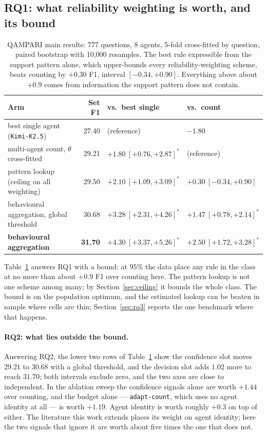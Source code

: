 \documentclass{article}
\begin{document}
\subsection{RQ1: what reliability weighting is worth, and its bound}
\label{sec:rq1}

\begin{table}
  \caption{QAMPARI main results: 777 questions, 8 agents, 5-fold cross-fitted by question, paired bootstrap with 10,000 resamples. The best rule expressible from the support pattern alone, which upper-bounds every reliability-weighting scheme, beats counting by $+0.30$ F1, interval $[-0.34, +0.90]$. Everything above about $+0.9$ comes from information the support pattern does not contain.}
  \label{tab:main}
  \centering
  \begin{tabular}{lrll}
    \toprule
    Arm & Set F1 & vs.\ best single & vs.\ count \\
    \midrule
    best single agent (\texttt{Kimi-K2.5})  & 27.40 & (reference)              & $-1.80$ \\
    multi-agent count, $\theta$ cross-fitted & 29.21 & $+1.80\ [+0.76,+2.87]^*$ & (reference) \\
    pattern lookup (ceiling on all weighting) & 29.50 & $+2.10\ [+1.09,+3.09]^*$ & $+0.30\ [-0.34,+0.90]$ \\
    behavioural aggregation, global threshold & 30.68 & $+3.28\ [+2.31,+4.26]^*$ & $+1.47\ [+0.78,+2.14]^*$ \\
    \textbf{behavioural aggregation}         & \textbf{31.70} & $\mathbf{+4.30\ [+3.37,+5.26]^*}$ & $\mathbf{+2.50\ [+1.72,+3.28]^*}$ \\
    \bottomrule
  \end{tabular}
\end{table}


Table~\ref{tab:main} answers RQ1 with a bound: at $95\%$ the data place any rule in the class at no more than about $+0.9$ F1 over counting here. The pattern lookup is not one scheme among many; by Section~\ref{sec:ceiling} it bounds the whole class. The bound is on the population optimum, and the estimated lookup can be beaten in sample where cells are thin; Section~\ref{sec:rq3} reports the one benchmark where that happens.

\paragraph{RQ2: what lies outside the bound.}
Answering RQ2, the lower two rows of Table~\ref{tab:main} show the confidence slot moves $29.21$ to $30.68$ with a global threshold, and the decision slot adds $1.02$ more to reach $31.70$; both intervals exclude zero, and the two axes are close to independent. In the ablation sweep the confidence signals alone are worth $+1.44$ over counting, and the budget alone --- \texttt{adapt-count}, which uses no agent identity at all --- is worth $+1.19$. %
Agent identity is worth roughly $+0.3$ on top of either. The literature this work extends places its weight on agent identity; here the two signals that ignore it are worth about five times the one that does not.
\end{document}
